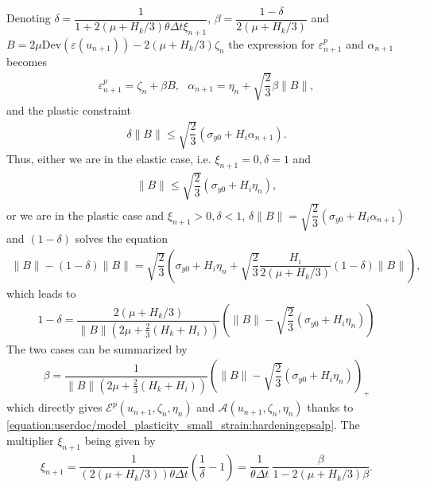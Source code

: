 \documentclass[a4paper,11pt,english]{sphinxmanual}
\begin{document}

Denoting \(\delta = \dfrac{1}{1+2(\mu+H_k/3)\theta\Delta t\xi_{n+1}}\), \(\beta = \dfrac{1-\delta}{2(\mu+H_k/3)}\) and \(B = 2\mu\mbox{Dev}(\varepsilon(u_{n+1}))-2(\mu+H_k/3)\zeta_n\) the expression for \(\varepsilon^p_{n+1}\) and \(\alpha_{n+1}\) becomes
\begin{equation}\label{equation:userdoc/model_plasticity_small_strain:hardeningepsalp}
\begin{split}\varepsilon^p_{n+1} = \zeta_n+\beta B, ~~~ \alpha_{n+1} = \eta_n + \sqrt{\dfrac{2}{3}}\beta \|B\|,\end{split}
\end{equation}
and the plastic constraint
\begin{equation*}
\begin{split}\delta \|B\| \le \sqrt{\dfrac{2}{3}}(\sigma_{y0}+H_i \alpha_{n+1}).\end{split}
\end{equation*}
Thus, either we are in the elastic case, i.e. \(\xi_{n+1} = 0, \delta = 1\) and
\begin{equation*}
\begin{split}\|B\| \le \sqrt{\dfrac{2}{3}}(\sigma_{y0}+H_i \eta_n),\end{split}
\end{equation*}
or we are in the plastic case and \(\xi_{n+1} > 0, \delta < 1\), \(\delta \|B\| = \sqrt{\dfrac{2}{3}}(\sigma_{y0}+H_i \alpha_{n+1})\) and \((1-\delta)\) solves the equation
\begin{equation*}
\begin{split}\|B\| - (1-\delta)\|B\| = \sqrt{\dfrac{2}{3}}\left(\sigma_{y0}+H_i \eta_n + \sqrt{\dfrac{2}{3}} \dfrac{H_i}{2(\mu+H_k/3)}(1-\delta)\|B\|\right),\end{split}
\end{equation*}
which leads to
\begin{equation*}
\begin{split}1-\delta = \dfrac{2(\mu+H_k/3)}{\|B\|(2\mu+\frac{2}{3}(H_k+H_i))}\left(\|B\|-\sqrt{\dfrac{2}{3}}(\sigma_{y0}+H_i \eta_n) \right)\end{split}
\end{equation*}
The two cases can be summarized by
\begin{equation*}
\begin{split}\beta = \dfrac{1}{\|B\|(2\mu+\frac{2}{3}(H_k+H_i))}\left(\|B\|-\sqrt{\dfrac{2}{3}}(\sigma_{y0}+H_i \eta_n) \right)_+\end{split}
\end{equation*}
which directly gives \({\mathscr E}^p(u_{n+1}, \zeta_n, \eta_n)\) and \({\mathscr A}(u_{n+1}, \zeta_n, \eta_n)\) thanks to \eqref{equation:userdoc/model_plasticity_small_strain:hardeningepsalp}. The multiplier \(\xi_{n+1}\) being given by
\begin{equation*}
\begin{split}\xi_{n+1} = \dfrac{1}{(2(\mu+H_k/3))\theta\Delta t}(\dfrac{1}{\delta}-1) = \dfrac{1}{\theta\Delta t}~\dfrac{\beta}{1-2(\mu+H_k/3)\beta}.\end{split}
\end{equation*}
\end{document}
